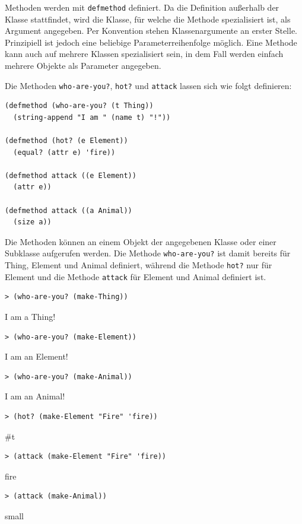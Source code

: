 Methoden werden mit \texttt{defmethod} definiert. Da die Definition außerhalb der Klasse stattfindet, wird die Klasse, für welche die Methode spezialisiert ist, als Argument angegeben. Per Konvention stehen Klassenargumente an erster Stelle. Prinzipiell ist jedoch eine beliebige Parameterreihenfolge möglich. Eine Methode kann auch auf mehrere Klassen spezialisiert sein, in dem Fall werden einfach mehrere Objekte als Parameter angegeben.

Die Methoden \texttt{who-are-you?}, \texttt{hot?} und \texttt{attack} lassen sich wie folgt definieren:

\begin{lstlisting}
(defmethod (who-are-you? (t Thing))
  (string-append "I am " (name t) "!"))

(defmethod (hot? (e Element))
  (equal? (attr e) 'fire))
  
(defmethod attack ((e Element))
  (attr e))
  
(defmethod attack ((a Animal))
  (size a))
\end{lstlisting}

Die Methoden können an einem Objekt der angegebenen Klasse oder einer Subklasse aufgerufen werden. Die Methode \texttt{who-are-you?} ist damit bereits für Thing, Element und Animal definiert, während die Methode \texttt{hot?} nur für Element und die Methode \texttt{attack} für Element und Animal definiert ist.

\begin{lstlisting}
> (who-are-you? (make-Thing))
\end{lstlisting}
{\routput {\qq}I am a Thing!\qq}

\begin{lstlisting}
> (who-are-you? (make-Element))
\end{lstlisting}
{\routput {\qq}I am an Element!\qq}

\begin{lstlisting}
> (who-are-you? (make-Animal))
\end{lstlisting}
{\routput {\qq}I am an Animal!\qq}

\begin{lstlisting}
> (hot? (make-Element "Fire" 'fire))
\end{lstlisting}
{\routput \#t}

\begin{lstlisting}
> (attack (make-Element "Fire" 'fire))
\end{lstlisting}
{\rsymbol fire}

\begin{lstlisting}
> (attack (make-Animal))
\end{lstlisting}
{\rsymbol small}


